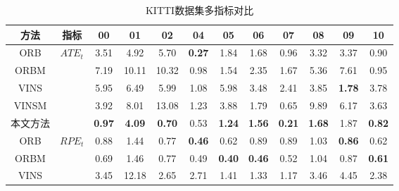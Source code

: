 \begin{table}
\centering
\caption{KITTI数据集多指标对比}
\begin{tabular}{c|c|cccccccccc}
\toprule
方法    & 指标                    & 00            & 01            & 02            & 04            & 05            & 06            & 07            & 08            & 09            & 10            \\ \midrule
ORB   & \multirow{5}{*}{$ATE_t$\textdownarrow{}}  & 3.51          & 4.92          & 5.70          & \cellcolor[HTML]{FA7F6F}\textbf{0.27} & 1.84          & 1.68          & 0.96          & 3.32          & 3.37          & 0.90          \\
ORBM  &                       & 7.19          & 10.11         & 10.32         & 0.98          & 1.54          & 2.35          & 1.67          & 5.36          & 7.61          & 0.95          \\
VINS  &                       & 5.95          & 6.49          & 5.99          & 1.08          & 5.98          & 3.48          & 2.41          & 3.85          & \cellcolor[HTML]{FA7F6F}\textbf{1.78}          & 3.78          \\
VINSM &                       & 3.92          & 8.01          & 13.08         & 1.23          & 3.88          & 1.79          & 0.65          & 9.89          & 6.17          & 3.63          \\
本文方法    &                       & \cellcolor[HTML]{FA7F6F}\textbf{0.97} & \cellcolor[HTML]{FA7F6F}\textbf{4.09} & \cellcolor[HTML]{FA7F6F}\textbf{0.70} & 0.53          & \cellcolor[HTML]{FA7F6F}\textbf{1.24} & \cellcolor[HTML]{FA7F6F}\textbf{1.56} & \cellcolor[HTML]{FA7F6F}\textbf{0.21} & \cellcolor[HTML]{FA7F6F}\textbf{1.68} & 1.87 & \cellcolor[HTML]{FA7F6F}\textbf{0.82} \\ \midrule
ORB   & \multirow{5}{*}{$RPE_t$\textdownarrow{}} & 0.88          & 1.44          & 0.77          & \cellcolor[HTML]{FA7F6F}\textbf{0.46} & 0.62          & 0.89          & 0.89          & 1.03          & \cellcolor[HTML]{FA7F6F}\textbf{0.86} & 0.62          \\
ORBM  &                       & 0.69          & 1.46          & 0.77          & 0.49          & \cellcolor[HTML]{FA7F6F}\textbf{0.40} & \cellcolor[HTML]{FA7F6F}\textbf{0.46} & 0.52          & 1.04          & 0.87          & \cellcolor[HTML]{FA7F6F}\textbf{0.61} \\
VINS  &                       & 3.45          & 12.18         & 2.65          & 2.71          & 1.41          & 1.33          & 1.17          & 3.46          & 4.45          & 2.38          \\

\end{tabular}
\end{table}
